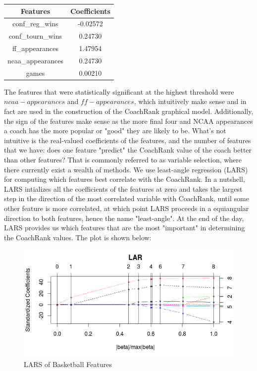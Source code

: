\documentclass[titlepage,11pt]{article}
\begin{document}
\begin{center}
\begin{tabular}{ | c | c |}
\hline
Features            & Coefficients \\\hline
conf\_reg\_wins       & -0.02572      \\\hline
conf\_tourn\_wins     & 0.24730     \\\hline
ff\_appearances      &  1.47954    \\\hline
ncaa\_appearances    & 0.24730      \\\hline
games               & 0.00210      \\
\hline
\end{tabular}
\end{center}

\vspace{2 mm}

\noindent The features that were statistically significant at the highest threshold were $ncaa-appearances$ and $ff-appearances$, which intuitively make sense and in fact are used in the construction of the CoachRank graphical model. Additionally, the sign of the features make sense as the more final four and NCAA appearances a coach has the more popular or "good" they are likely to be. What's not intuitive is the real-valued coefficients of the features, and the number of features that we have: does one feature "predict" the CoachRank value of the coach better than other features? That is commonly referred to as variable selection, where there currently exist a wealth of methods. We use least-angle regression (LARS) for computing which features best correlate with the CoachRank. In a nutshell, LARS intializes all the coefficients of the features at zero and takes the largest step in the direction of the most correlated variable with CoachRank, until some other feature is more correlated, at which point LARS proceeds in a equiangular direction to both features, hence the name "least-angle". At the end of the day, LARS provides us which features that are the most "important" in determining the CoachRank values. The plot is shown below:

\begin{figure}[H]
      \caption{LARS of Basketball Features}
      \centering
      \includegraphics[width=1.0\textwidth]{bball_lars.png}
\end{figure}
\end{document}
